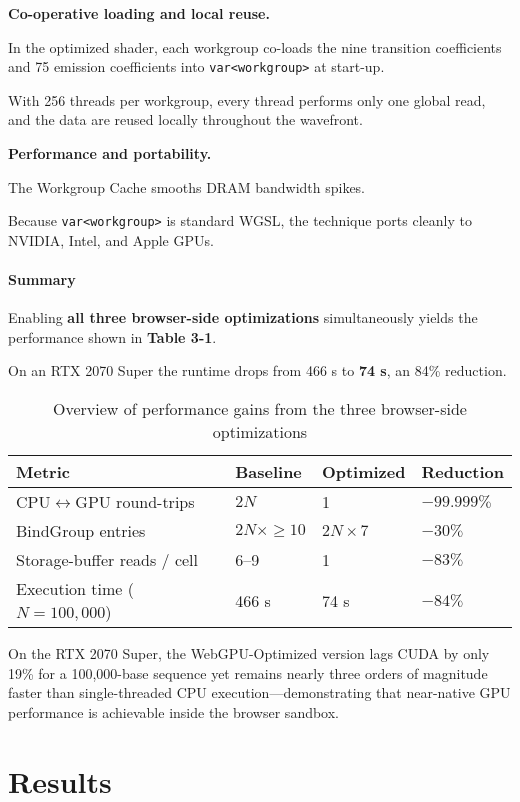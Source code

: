 \documentclass[12pt]{report}
\begin{document}
\textbf{Co-operative loading and local reuse.}

In the optimized shader, each workgroup co-loads the nine transition coefficients and 75 emission coefficients into \texttt{var<workgroup>} at start-up.

With 256 threads per workgroup, every thread performs only one global read, and the data are reused locally throughout the wavefront.

\textbf{Performance and portability.}

The Workgroup Cache smooths DRAM bandwidth spikes.

Because \texttt{var<workgroup>} is standard WGSL, the technique ports cleanly to NVIDIA, Intel, and Apple GPUs.

\subsubsection{Summary}
Enabling \textbf{all three browser-side optimizations} simultaneously yields the performance shown in \textbf{Table 3-1}.

On an RTX 2070 Super the runtime drops from 466 s to \textbf{74 s}, an 84\% reduction.

\begin{table}[h]
    \centering
    \begin{tabularx}{\textwidth}{|X|X|X|X|}
        \hline
        Metric & Baseline & Optimized & Reduction \\
        \hline
        CPU$\leftrightarrow$GPU round-trips & $2N$ & 1 & $-99.999\%$ \\
        BindGroup entries & $2N \times \geq 10$ & $2N \times 7$ & $-30\%$ \\
        Storage-buffer reads / cell & 6–9 & 1 & $-83\%$ \\
        Execution time ($N = 100,000$) & 466 s & 74 s & $-84\%$ \\
        \hline
    \end{tabularx}
    \caption{Overview of performance gains from the three browser-side optimizations}
    \label{tab:opt_performance}
\end{table}

On the RTX 2070 Super, the WebGPU-Optimized version lags CUDA by only 19\% for a 100,000-base sequence yet remains nearly three orders of magnitude faster than single-threaded CPU execution—demonstrating that near-native GPU performance is achievable inside the browser sandbox.

\chapter{Results}
\end{document}
